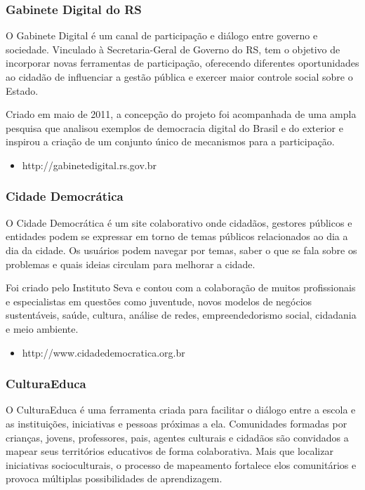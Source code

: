 \documentclass[12pt]{article}
\begin{document}
\subsubsection{Gabinete Digital do RS}

O Gabinete Digital é um canal de participação e diálogo entre governo e
sociedade. Vinculado à Secretaria-Geral de Governo do RS, tem o objetivo de
incorporar novas ferramentas de participação, oferecendo diferentes
oportunidades ao cidadão de influenciar a gestão pública e exercer maior
controle social sobre o Estado.

Criado em maio de 2011, a concepção do projeto foi acompanhada de uma ampla
pesquisa que analisou exemplos de democracia digital do Brasil e do exterior e
inspirou a criação de um conjunto único de mecanismos para a participação.

\begin{itemize}
  \item http://gabinetedigital.rs.gov.br
\end{itemize}

\subsubsection{Cidade Democrática}

O Cidade Democrática é um site colaborativo onde cidadãos, gestores públicos e
entidades podem se expressar em torno de temas públicos relacionados ao dia a
dia da cidade. Os usuários podem navegar por temas, saber o que se fala sobre
os problemas e quais ideias circulam para melhorar a cidade.

Foi criado pelo Instituto Seva e contou com a
colaboração de muitos profissionais e especialistas em questões como
juventude, novos modelos de negócios sustentáveis, saúde, cultura, análise de
redes, empreendedorismo social, cidadania e meio ambiente.

\begin{itemize}
  \item http://www.cidadedemocratica.org.br
\end{itemize}

\subsubsection{CulturaEduca}

O CulturaEduca é uma ferramenta criada para facilitar o diálogo entre a escola
e as instituições, iniciativas e pessoas próximas a ela. Comunidades formadas
por crianças, jovens, professores, pais, agentes culturais e cidadãos são
convidados a mapear seus territórios educativos de forma colaborativa. Mais
que localizar iniciativas socioculturais, o processo de mapeamento fortalece
elos comunitários e provoca múltiplas possibilidades de aprendizagem.
\end{document}
